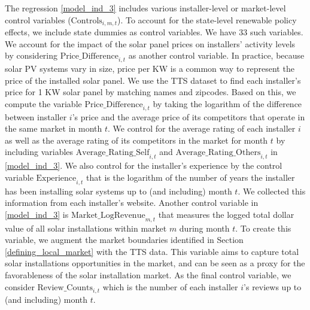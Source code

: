 \documentclass[msom,blindrev]{informs3}
\begin{document}
 The regression \eqref{model_ind_3} includes various installer-level or market-level control variables ($\text{Controls}_{i,m,t}$).  To account for the state-level renewable policy effects, we include state dummies as control variables. We have 33 such variables. We account for the impact of the solar panel prices on installers' activity levels by considering $\text{Price\_Difference}_{i,t}$ as another control variable.  In practice, because solar PV systems vary in size, price per KW is a common way to represent the price of the installed solar panel. We use the TTS dataset to find each installer's price for 1 KW solar panel by matching names and zipcodes. Based on this, we compute the variable $\text{Price\_Difference}_{i,t}$ by taking the logarithm of the difference between installer $i$'s price and the average price of its competitors that operate in the same market in month $t$.  We control for the average rating of each installer $i$ as well as the average rating of its competitors in the market for month $t$ by including variables $\text{Average\_Rating\_Self}_{i,t}$ and $\text{Average\_Rating\_Others}_{i,t}$ in \eqref{model_ind_3}. We also control for the installer's experience by the control variable $\text{Experience}_{i,t}$ that is the logarithm of the number of years the installer has been installing solar systems up to (and including) month $t$. We collected this information from each installer's website. Another control variable in \eqref{model_ind_3} is $\text{Market\_LogRevenue}_{m,t}$  that measures the logged total dollar value of all solar installations within market $m$ during month $t$. To create this variable, we augment the market boundaries identified in Section \ref{defining_local_market} with the TTS data. This variable aims to capture total solar installations opportunities in the market, and can be seen as a proxy for the favorableness of the solar installation market. As the final control variable, we consider  $\text{Review\_Counts}_{i,t}$ which is the number of each installer $i$'s reviews up to (and including) month $t$.





%
\end{document}
